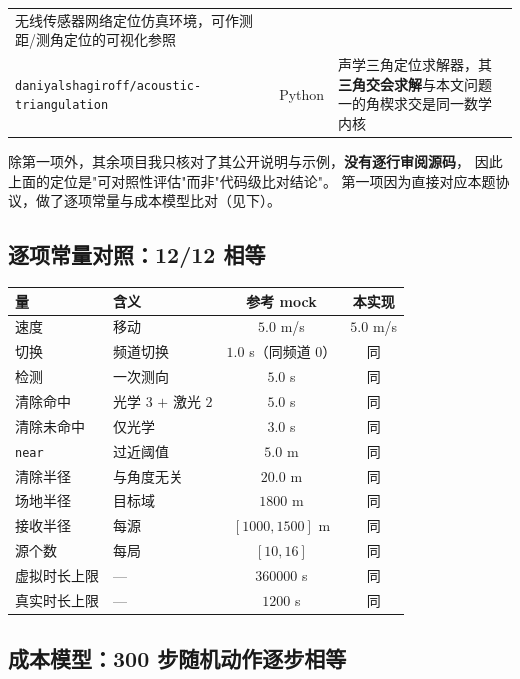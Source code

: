 \begin{longtable}{p{3.9cm}p{1.9cm}p{9.0cm}}
无线传感器网络定位仿真环境，可作测距/测角定位的可视化参照 \\
\texttt{daniyalshagiroff/\hspace{0pt}acoustic\hspace{0pt}-\hspace{0pt}triangulation} & Python &
声学三角定位求解器，其\textbf{三角交会求解}与本文问题一的角楔求交是同一数学内核 \\
\bottomrule
\end{longtable}

\begin{warnbox}[title=诚实说明]
除第一项外，其余项目我只核对了其公开说明与示例，\textbf{没有逐行审阅源码}，
因此上面的定位是"可对照性评估"而非"代码级比对结论"。
第一项因为直接对应本题协议，做了逐项常量与成本模型比对（见下）。
\end{warnbox}

\subsection{逐项常量对照：12/12 相等}

\begin{center}
\begin{tabular}{llcc}
\toprule
量 & 含义 & 参考 mock & 本实现 \\ \midrule
速度 & 移动 & $5.0$ m/s & $5.0$ m/s \\
切换 & 频道切换 & $1.0$ s（同频道 $0$） & 同 \\
检测 & 一次测向 & $5.0$ s & 同 \\
清除命中 & 光学 $3$ $+$ 激光 $2$ & $5.0$ s & 同 \\
清除未命中 & 仅光学 & $3.0$ s & 同 \\
\texttt{near} & 过近阈值 & $5.0$ m & 同 \\
清除半径 & 与角度无关 & $20.0$ m & 同 \\
场地半径 & 目标域 & $1800$ m & 同 \\
接收半径 & 每源 & $[1000,1500]$ m & 同 \\
源个数 & 每局 & $[10,16]$ & 同 \\
虚拟时长上限 & --- & $360000$ s & 同 \\
真实时长上限 & --- & $1200$ s & 同 \\
\bottomrule
\end{tabular}
\end{center}

\subsection{成本模型：300 步随机动作逐步相等}


